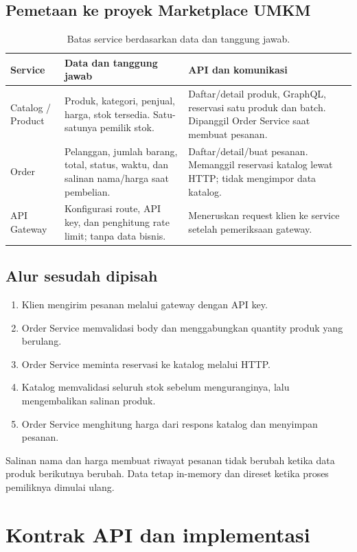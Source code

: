 \documentclass[11pt,a4paper]{article}
\begin{document}
\subsection{Pemetaan ke proyek Marketplace UMKM}
\begin{table}[H]
\small
\begin{tabularx}{\linewidth}{@{}L{2.6cm}Y Y@{}}
\toprule
Service & Data dan tanggung jawab & API dan komunikasi \\
\midrule
Catalog / Product &
Produk, kategori, penjual, harga, stok tersedia. Satu-satunya pemilik stok. &
Daftar/detail produk, GraphQL, reservasi satu produk dan batch. Dipanggil
Order Service saat membuat pesanan. \\
Order &
Pelanggan, jumlah barang, total, status, waktu, dan salinan nama/harga saat pembelian. &
Daftar/detail/buat pesanan. Memanggil reservasi katalog lewat HTTP; tidak
mengimpor data katalog. \\
API Gateway &
Konfigurasi route, API key, dan penghitung rate limit; tanpa data bisnis. &
Meneruskan request klien ke service setelah pemeriksaan gateway. \\
\bottomrule
\end{tabularx}
\caption{Batas service berdasarkan data dan tanggung jawab.}
\end{table}

\subsection{Alur sesudah dipisah}
\begin{enumerate}
\item Klien mengirim pesanan melalui gateway dengan API key.
\item Order Service memvalidasi body dan menggabungkan quantity produk yang berulang.
\item Order Service meminta reservasi ke katalog melalui HTTP.
\item Katalog memvalidasi seluruh stok sebelum menguranginya, lalu mengembalikan salinan produk.
\item Order Service menghitung harga dari respons katalog dan menyimpan pesanan.
\end{enumerate}

Salinan nama dan harga membuat riwayat pesanan tidak berubah ketika data
produk berikutnya berubah. Data tetap in-memory dan direset ketika proses
pemiliknya dimulai ulang.

\clearpage
\section{Kontrak API dan implementasi}
\end{document}
